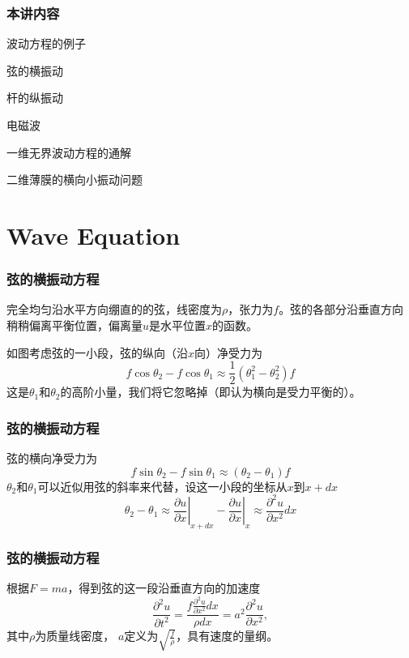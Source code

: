 \documentclass[CJK]{beamer}
\date{}
\begin{document}
  \bch
{}

\begin{frame}
\frametitle{本讲内容}

\bitem
\item{波动方程的例子
\bitem  
\item{弦的横振动}
\item{杆的纵振动}
\item{电磁波}
  \eitem}
\item{一维无界波动方程的通解}
\item{二维薄膜的横向小振动问题}  
\eitem

\end{frame}


\section{Wave Equation}

\begin{frame}
\frametitle{弦的横振动方程}

完全均匀沿水平方向绷直的的弦，线密度为$\rho$，张力为$f$。弦的各部分沿垂直方向稍稍偏离平衡位置，偏离量$u$是水平位置$x$的函数。


如图考虑弦的一小段，弦的纵向（沿$x$向）净受力为 $$ f \cos\theta_2 - f\cos\theta_1 \approx \frac{1}{2}\left(\theta_1^2-\theta_2^2\right) f $$
这是$\theta_1$和$\theta_2$的高阶小量，我们将它忽略掉（即认为横向是受力平衡的）。


\end{frame}



\begin{frame}
\frametitle{弦的横振动方程}


弦的横向净受力为 $$ f \sin\theta_2 - f\sin\theta_1 \approx \left(\theta_2-\theta_1\right) f $$
$\theta_2$和$\theta_1$可以近似用弦的斜率来代替，设这一小段的坐标从$x$到$x+dx$
$$\theta_2-\theta_1 \approx \left.\frac{\partial u}{\partial x}\right\vert_{x+dx}-\left.\frac{\partial u}{\partial x}\right\vert_{x} \approx \frac{\partial^2u}{\partial x^2} dx $$


\end{frame}


\begin{frame}
\frametitle{弦的横振动方程}

根据$F=ma$，得到弦的这一段沿垂直方向的加速度
$$\frac{\partial ^2u}{\partial t^2} = \frac{f\frac{\partial^2u}{\partial x^2} dx}{\rho dx} = a^2 \frac{\partial^2u}{\partial x^2} ,$$
其中$\rho$为质量线密度， $a$定义为$\sqrt{\frac{f}{\rho}}$，具有速度的量纲。


\end{frame}
\end{document}
